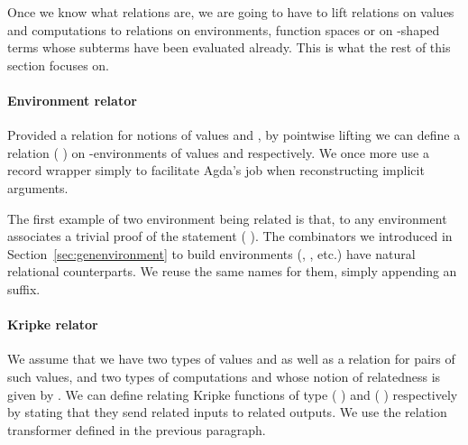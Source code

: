 \begin{minipage}{\textwidth}
\begin{minipage}[t]{0.65\textwidth}
\end{minipage}
\begin{minipage}[t]{0.25\textwidth}
\end{minipage}
\end{minipage}

Once we know what relations are, we are going to have to lift relations on values
and computations to relations on environments,  function spaces or
on -shaped terms whose subterms have been evaluated already.
This is what the rest of this section focuses on.

\paragraph*{Environment relator}
Provided a relation  for notions of values  and , by
pointwise lifting we can define a relation {(  )} on
-environments of values  and  respectively. We once more
use a record wrapper simply to facilitate Agda's job when reconstructing
implicit arguments.

\begin{agdasnippet}
\end{agdasnippet}

The first example of two environment being related is  that, to any
environment  associates a trivial proof of the statement
{(    )}.
The combinators we introduced in Section~\ref{sec:genenvironment} to build environments
(, , etc.) have natural relational counterparts. We reuse the same
names for them, simply appending an  suffix.

\paragraph*{Kripke relator}
We assume that we have two types of values  and 
as well as a relation  for pairs of such values, and two types of computations
 and  whose notion of relatedness is given by . We can define
 relating Kripke functions of type
{(  )} and {(  )}
respectively by stating that they send related inputs
to related outputs. We use the relation transformer  defined in the previous
paragraph.

